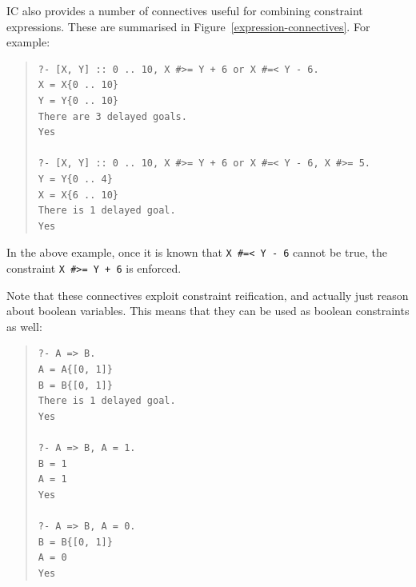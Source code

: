 


IC also provides a number of connectives useful for combining constraint
expressions.  These are summarised in Figure~\ref{expression-connectives}.
For example:

\begin{quote}\begin{verbatim}
?- [X, Y] :: 0 .. 10, X #>= Y + 6 or X #=< Y - 6.
X = X{0 .. 10}
Y = Y{0 .. 10}
There are 3 delayed goals.
Yes

?- [X, Y] :: 0 .. 10, X #>= Y + 6 or X #=< Y - 6, X #>= 5.
Y = Y{0 .. 4}
X = X{6 .. 10}
There is 1 delayed goal.
Yes
\end{verbatim}\end{quote}

In the above example, once it is known that \texttt{X \#=< Y - 6} cannot be
true, the constraint \texttt{X \#>= Y + 6} is enforced.

Note that these connectives exploit constraint reification, and actually
just reason about boolean variables.  This means that they can be used as
boolean constraints as well:

\begin{quote}\begin{verbatim}
?- A => B.
A = A{[0, 1]}
B = B{[0, 1]}
There is 1 delayed goal.
Yes

?- A => B, A = 1.
B = 1
A = 1
Yes

?- A => B, A = 0.
B = B{[0, 1]}
A = 0
Yes
\end{verbatim}\end{quote}


